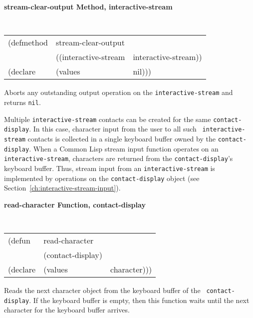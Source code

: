 \documentclass[twoside]{book}
\begin{document}
\begin{sloppy}
\begin{flushright}
{}
\end{flushright}

{\samepage
{\large {\bf stream-clear-output \hfill Method, interactive-stream}}
\begin{flushright} \parbox[t]{6.125in}{
\tt
\begin{tabular}{lll}
\raggedright
(defmethod & stream-clear-output & \\
& ((interactive-stream  &interactive-stream))\\
(declare &(values &nil)))
\end{tabular}
\rm

}\end{flushright}}

\begin{flushright} \parbox[t]{6.125in}{
Aborts any outstanding output operation on the {\tt interactive-stream} and returns
{\tt nil}.
 
}
\end{flushright}

Multiple {\tt interactive-stream} contacts can be created for the same
{\tt contact-display}. In
this case, character input from the user to all such {\tt
interactive-stream} contacts is collected in a single keyboard
buffer owned by the {\tt contact-display}. When a Common Lisp stream input
function operates on an {\tt interactive-stream}, characters are returned from
the {\tt contact-display}'s keyboard buffer. Thus,
stream input from an {\tt interactive-stream} is implemented by operations on the
{\tt contact-display} object (see Section~\ref{ch:interactive-stream-input}).

{\samepage
{\large {\bf read-character \hfill Function, contact-display}}
\begin{flushright} \parbox[t]{6.125in}{
\tt
\begin{tabular}{lll}
\raggedright
(defun & read-character & \\
& (contact-display)\\
(declare &(values &character)))
\end{tabular}
\rm

}\end{flushright}}

\begin{flushright} \parbox[t]{6.125in}{
Reads the next character object from the keyboard buffer of the {\tt
contact-display}. If the keyboard buffer is empty, then this function
waits until the next character for the keyboard buffer arrives.

}
\end{flushright}
\end{sloppy}
\end{document}
